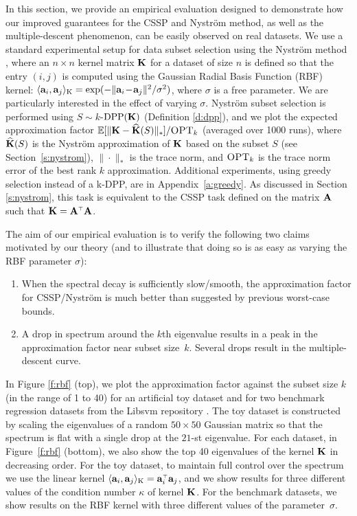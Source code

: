 \documentclass{article}
\begin{document}
In this section, we provide an empirical evaluation designed to demonstrate how our improved guarantees for the CSSP and Nystr\"om method, as well as the multiple-descent phenomenon, can be easily observed on real datasets. 
We use a standard experimental setup for data subset selection using
the Nystr\"om method \citep{revisiting-nystrom}, where an $n\times n$
kernel matrix $\mathbf K$ for a dataset of size $n$ is defined so that the
entry $(i,j)$ is computed using the Gaussian Radial Basis Function  (RBF)
kernel:
$\langle\mathbf a_i,\mathbf a_j\rangle_\text{K}=\exp(-\|\mathbf a_i\!-\!\mathbf a_j\|^2/\sigma^2)$,
where $\sigma$ is a free parameter. 
We are particularly interested in the effect of varying $\sigma$.
Nystr\"om subset selection is performed using $S\sim k$-${\mathrm{DPP}}(\mathbf K)$
(Definition \ref{d:dpp}), and we plot the expected approximation
factor $\mathbb E[\|\mathbf K-{\widehat{\mathbf K}}(S)\|_*]/{\textsc{OPT}_k}$ (averaged over 1000 runs), where
${\widehat{\mathbf K}}(S)$ is the Nystr\"om approximation of $\mathbf K$ based on the subset
$S$ (see Section~\ref{s:nystrom}), $\|\cdot\|_*$ is the trace norm,
and ${\textsc{OPT}_k}$ is the trace norm error of the best rank $k$
approximation. Additional experiments, using greedy selection instead 
of a k-DPP, are in Appendix~\ref{a:greedy}.
As discussed in Section \ref{s:nystrom}, this task is
equivalent to the CSSP task defined on the matrix $\mathbf A$ such that
$\K=\A^\top\A$. 



The aim of our empirical evaluation is to verify the following two claims motivated by our theory (and to illustrate that doing so is as easy as varying the RBF parameter $\sigma$):
\begin{enumerate}
  \item When the spectral decay is sufficiently slow/smooth, the
    approximation factor for CSSP/Nystr\"om is much better than
    suggested by previous worst-case bounds.
  \item  A drop in spectrum around the $k$th eigenvalue results in
    a peak in the approximation factor near
    subset size~$k$. Several drops result in the
    multiple-descent curve.
  \end{enumerate}
In Figure \ref{f:rbf} (top), we plot the approximation factor against
the subset size $k$ (in the range of 1 to 40) for an artificial toy
dataset and 
for two benchmark regression datasets from the Libsvm repository
\citep[\emph{bodyfat} and \emph{eunite2001}, see][]{libsvm}. 
The toy dataset is constructed by scaling the eigenvalues of a random
$50\times 50$ Gaussian matrix so that the spectrum is flat with a
single drop at the $21$-st eigenvalue. 
For each dataset, in Figure~\ref{f:rbf} (bottom), we also show the top
40 eigenvalues of the kernel $\mathbf K$ in decreasing order. 
For the toy dataset, to maintain full control over the spectrum we use
the linear kernel $\langle\a_i,\a_j\rangle_\text{K}=\a_i^\top\a_j$, and we show results
for three different values of the condition number $\kappa$ of kernel
$\mathbf K$.  
For the benchmark datasets, we show results on the RBF kernel with 
three different values of the parameter~$\sigma$.  
\end{document}
